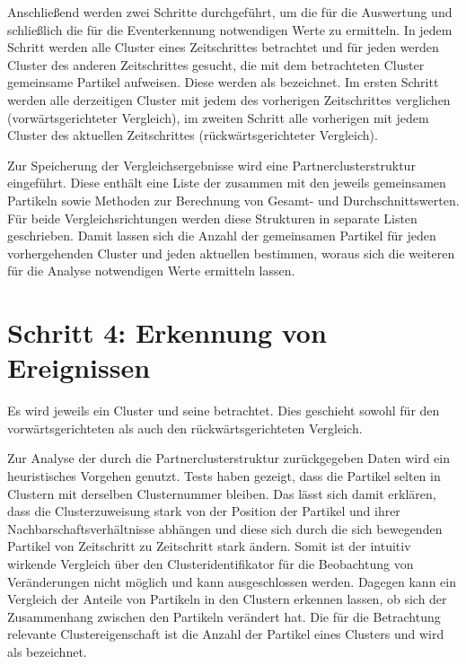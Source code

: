 Anschließend werden zwei Schritte durchgeführt, um die für die Auswertung und schließlich die für die Eventerkennung notwendigen Werte zu ermitteln. In jedem Schritt werden alle Cluster eines Zeitschrittes betrachtet und für jeden werden Cluster des anderen Zeitschrittes gesucht, die mit dem betrachteten Cluster gemeinsame Partikel aufweisen. Diese werden als  bezeichnet. Im ersten Schritt werden alle derzeitigen Cluster mit jedem des vorherigen Zeitschrittes verglichen (vorwärtsgerichteter Vergleich), im zweiten Schritt alle vorherigen mit jedem Cluster des aktuellen Zeitschrittes (rückwärtsgerichteter Vergleich). 

Zur Speicherung der Vergleichsergebnisse wird eine Partnerclusterstruktur eingeführt. Diese enthält eine Liste der  zusammen mit den jeweils gemeinsamen Partikeln sowie Methoden zur Berechnung von Gesamt- und Durchschnittswerten. Für beide Vergleichsrichtungen werden diese Strukturen in separate Listen geschrieben. Damit lassen sich die Anzahl der gemeinsamen Partikel für jeden vorhergehenden Cluster und jeden aktuellen bestimmen, woraus sich die weiteren für die Analyse notwendigen Werte ermitteln lassen.

\section{Schritt 4: Erkennung von Ereignissen}\label{sec:ereigniserkennung}

Es wird jeweils ein Cluster und seine  betrachtet. Dies geschieht sowohl für den vorwärtsgerichteten als auch den rückwärtsgerichteten Vergleich.

Zur Analyse der durch die Partnerclusterstruktur zurückgegeben Daten wird ein heuristisches Vorgehen genutzt. Tests haben gezeigt, dass die Partikel selten in Clustern mit derselben Clusternummer bleiben. Das lässt sich damit erklären, dass die Clusterzuweisung stark von der Position der Partikel und ihrer Nachbarschaftsverhältnisse abhängen und diese sich durch die sich bewegenden Partikel von Zeitschritt zu Zeitschritt stark ändern. Somit ist der intuitiv wirkende Vergleich über den Clusteridentifikator für die Beobachtung von Veränderungen nicht möglich und kann ausgeschlossen werden. %
Dagegen kann ein Vergleich der Anteile von Partikeln in den Clustern erkennen lassen, ob sich der Zusammenhang zwischen den Partikeln verändert hat. Die für die Betrachtung relevante Clustereigenschaft ist die Anzahl der Partikel eines Clusters und wird als  bezeichnet.

